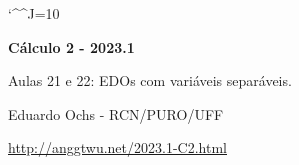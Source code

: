\documentclass[oneside,12pt]{article}
\begin{document}

\def\drafturl{http://anggtwu.net/LATEX/2023-1-C2.pdf}
\def\drafturl{http://anggtwu.net/2023.1-C2.html}
\def\draftfooter{\tiny \href{\drafturl}{\jobname{}} \ColorBrown{\shorttoday{} \hours}}


\catcode`\^^J=10

\def\Caurl   #1{\expr{Caurl("#1")}}
\def\Cahref#1#2{\href{\Caurl{#1}}{#2}}
\def\Ca      #1{\Cahref{#1}{#1}}

\def\pictgridstyle{\color{GrayPale}\linethickness{0.3pt}}
\def\pictaxesstyle{\linethickness{0.5pt}}
\def\pictnaxesstyle{\color{GrayPale}\linethickness{0.5pt}}
\celllower=2.5pt

\pu



%

\thispagestyle{empty}

\begin{center}

\vspace*{1.2cm}

{\bf \Large Cálculo 2 - 2023.1}

\bsk

Aulas 21 e 22: EDOs com variáveis separáveis.

\bsk

Eduardo Ochs - RCN/PURO/UFF

\url{http://anggtwu.net/2023.1-C2.html}

\end{center}

\newpage
\end{document}

